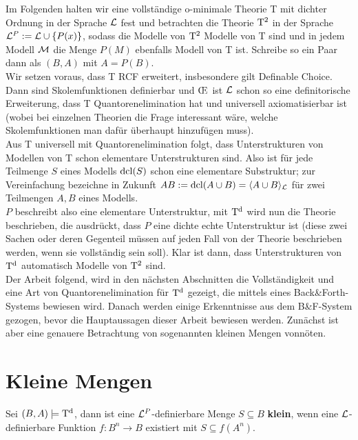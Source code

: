Im Folgenden halten wir eine vollständige o-minimale Theorie T mit dichter Ordnung in der Sprache $\mathcal{L}$ fest und betrachten die Theorie $\operatorname{T^2}$ in der Sprache $\mathcal{L}^P:=\mathcal{L}\cup\{P(x)\}$, sodass die Modelle von $\operatorname{T^2}$ Modelle von T sind und in jedem Modell $\mathcal{M}$ die Menge $P(M)$ ebenfalls Modell von T ist. Schreibe so ein Paar dann als $(B,A)$ mit $A=P(B)$.\\
Wir setzen voraus, dass T RCF erweitert, insbesondere gilt Definable Choice. Dann sind Skolemfunktionen definierbar und \OE\ ist $\mathcal{L}$ schon so eine definitorische Erweiterung, dass T Quantorenelimination hat und universell axiomatisierbar ist (wobei bei einzelnen Theorien die Frage interessant wäre, welche Skolemfunktionen man dafür überhaupt hinzufügen muss).\\
Aus T universell mit Quantorenelimination folgt, dass Unterstrukturen von Modellen von T schon elementare Unterstrukturen sind. Also ist für jede Teilmenge $S$ eines Modells $\operatorname{dcl}(S)$ schon eine elementare Substruktur; zur Vereinfachung bezeichne in Zukunft $AB:=\operatorname{dcl}(A\cup B)=\langle A\cup B\rangle_{\mathcal{L}}$ für zwei Teilmengen $A,B$ eines Modells.\\
$P$ beschreibt also eine elementare Unterstruktur, mit $\operatorname{T^d}$ wird nun die Theorie beschrieben, die ausdrückt, dass $P$ eine dichte echte Unterstruktur ist (diese zwei Sachen oder deren Gegenteil müssen auf jeden Fall von der Theorie beschrieben werden, wenn sie vollständig sein soll). Klar ist dann, dass Unterstrukturen von $\operatorname{T^d}$ automatisch Modelle von $\operatorname{T^2}$ sind.\\
Der Arbeit \cite{VanDenDries} folgend, wird in den nächsten Abschnitten die Vollständigkeit und eine Art von Quantorenelimination für $\operatorname{T^d}$ gezeigt, die mittels eines Back\&Forth-Systems bewiesen wird. Danach werden einige Erkenntnisse aus dem B\&F-System gezogen, bevor die Hauptaussagen dieser Arbeit bewiesen werden. Zunächst ist aber eine genauere Betrachtung von sogenannten kleinen Mengen vonnöten.

\section{Kleine Mengen}
\begin{definition}
	Sei $(B,A)\models\operatorname{T^d}$, dann ist eine $\mathcal{L}^P$-definierbare Menge $S\subseteq B$ \textbf{klein}, wenn eine $\mathcal{L}$-definierbare Funktion $f:B^n\rightarrow B$ existiert mit $S\subseteq f(A^n)$.
\end{definition}

